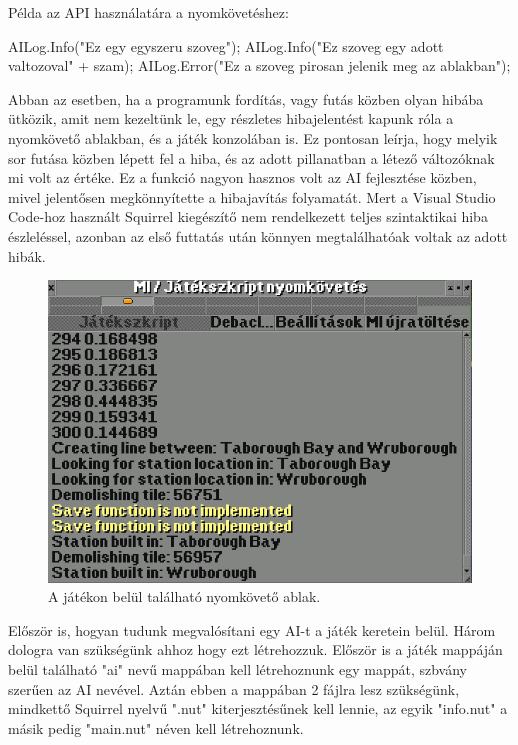 Példa az API használatára a nyomkövetéshez:
\begin{cpp}
AILog.Info("Ez egy egyszeru szoveg");
AILog.Info("Ez szoveg egy adott valtozoval" + szam);
AILog.Error("Ez a szoveg pirosan jelenik meg az ablakban");
\end{cpp}

Abban az esetben, ha a programunk fordítás, vagy futás közben olyan hibába ütközik, amit nem kezeltünk le, egy részletes hibajelentést kapunk róla a nyomkövető ablakban, és a játék konzolában is. Ez pontosan leírja, hogy melyik sor futása közben lépett fel a hiba, és az adott pillanatban a létező változóknak mi volt az értéke. Ez a funkció nagyon hasznos volt az AI fejlesztése közben, mivel jelentősen megkönnyítette a hibajavítás folyamatát. Mert a Visual Studio Code-hoz használt Squirrel kiegészítő nem rendelkezett teljes szintaktikai hiba észleléssel, azonban az első futtatás után könnyen megtalálhatóak voltak az adott hibák.

\begin{figure}
	\centering
	\includegraphics[scale=0.8]{images/console.png}
	\caption{A játékon belül található nyomkövető ablak.}
	\label{fig:console}
\end{figure}


Először is, hogyan tudunk megvalósítani egy AI-t a játék keretein belül. Három dologra van szükségünk ahhoz hogy ezt létrehozzuk. Először is a játék mappáján belül található "ai" nevű mappában kell létrehoznunk egy mappát, szbvány szerűen az AI nevével. Aztán ebben a mappában 2 fájlra lesz szükségünk, mindkettő Squirrel nyelvű ".nut" kiterjesztésűnek kell lennie, az egyik "info.nut" a másik pedig "main.nut" néven kell létrehoznunk.

